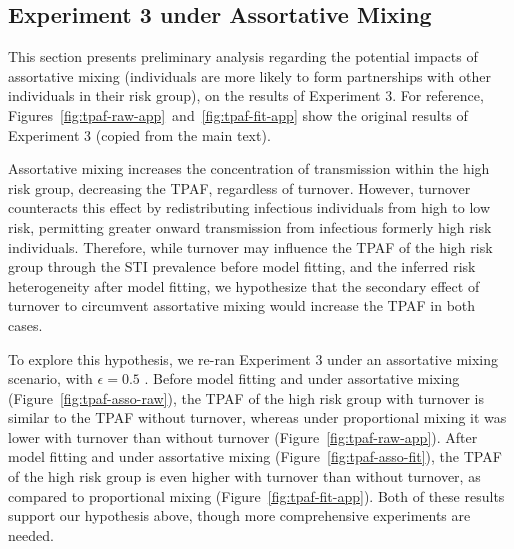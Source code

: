 \subsection{Experiment 3 under Assortative Mixing}\label{aa:what-if-asso}
This section presents preliminary analysis regarding
the potential impacts of assortative mixing
(individuals are more likely to form partnerships with
other individuals in their risk group),
on the results of Experiment 3.
For reference, Figures~\ref{fig:tpaf-raw-app}~and~\ref{fig:tpaf-fit-app}
show the original results of Experiment 3 (copied from the main text).
\par
Assortative mixing increases the concentration of transmission within the high risk group,
decreasing the TPAF, regardless of turnover.
However, turnover counteracts this effect by
redistributing infectious individuals from high to low risk,
permitting greater onward transmission from
infectious formerly high risk individuals.
Therefore,
while turnover may influence the TPAF of the high risk group through
the STI prevalence before model fitting, and
the inferred risk heterogeneity after model fitting,
we hypothesize that
the secondary effect of turnover to circumvent assortative mixing
would increase the TPAF in both cases.
\par
To explore this hypothesis,
we re-ran Experiment 3 under an assortative mixing scenario,
with $\epsilon = 0.5$ \citep{Nold1980}.
Before model fitting and under assortative mixing
(Figure~\ref{fig:tpaf-asso-raw}),
the TPAF of the high risk group with turnover
is similar to the TPAF without turnover,
whereas under proportional mixing it was lower with turnover than without turnover
(Figure~\ref{fig:tpaf-raw-app}).
After model fitting and under assortative mixing
(Figure~\ref{fig:tpaf-asso-fit}),
the TPAF of the high risk group is even higher with turnover than without turnover,
as compared to proportional mixing
(Figure~\ref{fig:tpaf-fit-app}).
Both of these results support our hypothesis above,
though more comprehensive experiments are needed.
